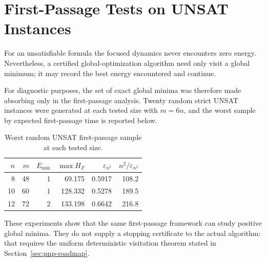 \section{First-Passage Tests on UNSAT Instances}
\label{sec:unsat-first-passage}

For an unsatisfiable formula the focused dynamics never encounters zero
energy.  Nevertheless, a certified global-optimization algorithm need only
visit a global minimum; it may record the best energy encountered and continue.

For diagnostic purposes, the set of exact global minima was therefore made
absorbing only in the first-passage analysis.  Twenty random strict UNSAT
instances were generated at each tested size with $m=6n$, and the worst sample
by expected first-passage time is reported below.

\begin{table}[t]
\centering
\caption{Worst random UNSAT first-passage sample at each tested size.}
\begin{tabular}{rrrrrr}
\toprule
$n$ & $m$ & $E_{\min}$ & $\max H_F$ & $\varepsilon_{n^2}$ &
$n^2/\varepsilon_{n^2}$ \\
\midrule
8 & 48 & 1 & 69.175 & 0.5917 & 108.2 \\
10 & 60 & 1 & 128.332 & 0.5278 & 189.5 \\
12 & 72 & 2 & 133.198 & 0.6642 & 216.8 \\
\bottomrule
\end{tabular}
\end{table}

These experiments show that the same first-passage framework can study positive
global minima.  They do not supply a stopping certificate to the actual
algorithm: that requires the uniform deterministic visitation theorem stated
in Section~\ref{sec:pnp-roadmap}.

